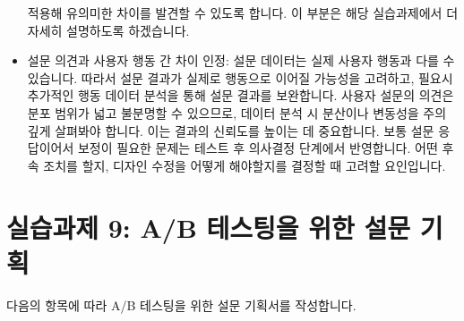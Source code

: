 \documentclass[
  letterpaper,
]{book}
\begin{document}
\begin{itemize}
  적용해 유의미한 차이를 발견할 수 있도록 합니다. 이 부분은 해당
  실습과제에서 더 자세히 설명하도록 하겠습니다.
\item
  설문 의견과 사용자 행동 간 차이 인정: 설문 데이터는 실제 사용자 행동과
  다를 수 있습니다. 따라서 설문 결과가 실제로 행동으로 이어질 가능성을
  고려하고, 필요시 추가적인 행동 데이터 분석을 통해 설문 결과를
  보완합니다. 사용자 설문의 의견은 분포 범위가 넓고 불분명할 수
  있으므로, 데이터 분석 시 분산이나 변동성을 주의 깊게 살펴봐야 합니다.
  이는 결과의 신뢰도를 높이는 데 중요합니다. 보통 설문 응답이어서 보정이
  필요한 문제는 테스트 후 의사결정 단계에서 반영합니다. 어떤 후속 조치를
  할지, 디자인 수정을 어떻게 해야할지를 결정할 때 고려할 요인입니다.
\end{itemize}

\section{실습과제 9: A/B 테스팅을 위한 설문
기획}\label{uxc2e4uxc2b5uxacfcuxc81c-9-ab-uxd14cuxc2a4uxd305uxc744-uxc704uxd55c-uxc124uxbb38-uxae30uxd68d}

다음의 항목에 따라 A/B 테스팅을 위한 설문 기획서를 작성합니다.
\end{document}
